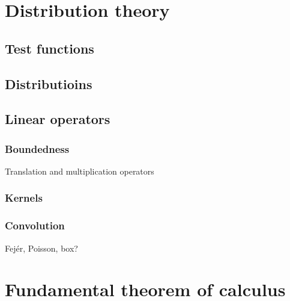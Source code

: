 \documentclass{../../large}
\begin{document}
\part{Distribution theory}
\chapter{Test functions}


\chapter{Distributioins}


\chapter{Linear operators}

\section{Boundedness}

Translation and multiplication operators

\begin{prb}
\end{prb}


\section{Kernels}
\begin{prb}
\end{prb}
\begin{prb}
\end{prb}

\section{Convolution}
\begin{prb}
Fej\'er, Poisson, box?
\end{prb}
\begin{prb}
\end{prb}











\part{Fundamental theorem of calculus}
\end{document}
